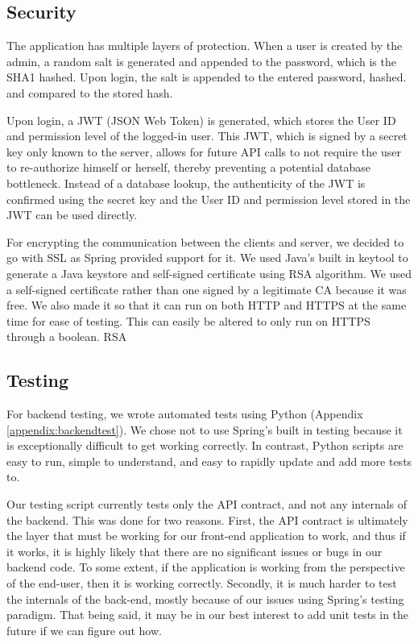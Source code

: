 \documentclass[12pt]{article}
\begin{document}
\subsection{Security}
The application has multiple layers of protection. When a user is created by the admin, a random salt is generated and appended to the password, which is the SHA1 hashed. Upon login, the salt is appended to the entered password, hashed. and compared to the stored hash. 

Upon login, a JWT (JSON Web Token) is generated, which stores the User ID and permission level of the logged-in user. This JWT, which is signed by a secret key only known to the server, allows for future API calls to not require the user to re-authorize himself or herself, thereby preventing a potential database bottleneck. Instead of a database lookup, the authenticity of the JWT is confirmed using the secret key and the User ID and permission level stored in the JWT can be used directly. 

For encrypting the communication between the clients and server, we decided to go with SSL as Spring provided support for it. We used Java's built in keytool to generate a Java keystore and self-signed certificate using RSA algorithm. We used a self-signed certificate rather than one signed by a legitimate CA because it was free. We also made it so that it can run on both HTTP and HTTPS at the same time for ease of testing. This can easily be altered to only run on HTTPS through a boolean.
RSA

\subsection{Testing}
For backend testing, we wrote automated tests using Python (Appendix \ref{appendix:backendtest}). We chose not to use Spring's built in testing because it is exceptionally difficult to get working correctly. In contrast, Python scripts are easy to run, simple to understand, and easy to rapidly update and add more tests to. 

Our testing script currently tests only the API contract, and not any internals of the backend. This was done for two reasons. First, the API contract is ultimately the layer that must be working for our front-end application to work, and thus if it works, it is highly likely that there are no significant issues or bugs in our backend code. To some extent, if the application is working from the perspective of the end-user, then it is working correctly. Secondly, it is much harder to test the internals of the back-end, mostly because of our issues using Spring's testing paradigm. That being said, it may be in our best interest to add unit tests in the future if we can figure out how. 
\end{document}
